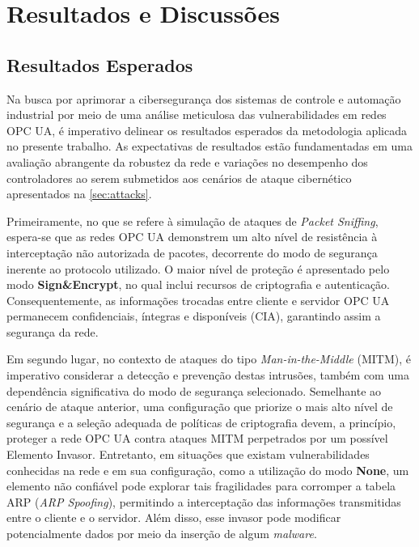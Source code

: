 \chapter{Resultados e Discussões} \label{cap:resultados}

\section{Resultados Esperados}

Na busca por aprimorar a cibersegurança dos sistemas de controle e automação industrial por meio de uma análise meticulosa das vulnerabilidades em redes OPC UA, é imperativo delinear os resultados esperados da metodologia aplicada no presente trabalho. As expectativas de resultados estão fundamentadas em uma avaliação abrangente da robustez da rede e variações no desempenho dos controladores ao serem submetidos aos cenários de ataque cibernético apresentados na \autoref{sec:attacks}.

Primeiramente, no que se refere à simulação de ataques de \textit{Packet Sniffing}, espera-se que as redes OPC UA demonstrem um alto nível de resistência à interceptação não autorizada de pacotes, decorrente do modo de segurança inerente ao protocolo utilizado. O maior nível de proteção é apresentado pelo modo \textbf{Sign\&Encrypt}, no qual inclui recursos de criptografia e autenticação. Consequentemente, as informações trocadas entre cliente e servidor OPC UA permanecem confidenciais, íntegras e disponíveis (CIA), garantindo assim a segurança da rede.

Em segundo lugar, no contexto de ataques do tipo \textit{Man-in-the-Middle} (MITM), é imperativo considerar a detecção e prevenção destas intrusões, também com uma dependência significativa do modo de segurança selecionado. Semelhante ao cenário de ataque anterior, uma configuração que priorize o mais alto nível de segurança e a seleção adequada de políticas de criptografia devem, a princípio, proteger a rede OPC UA contra ataques MITM perpetrados por um possível Elemento Invasor. Entretanto, em situações que existam vulnerabilidades conhecidas na rede e em sua configuração, como a utilização do modo \textbf{None}, um elemento não confiável pode explorar tais fragilidades para corromper a tabela ARP (\textit{ARP Spoofing}), permitindo a interceptação das informações transmitidas entre o cliente e o servidor. Além disso, esse invasor pode modificar potencialmente dados por meio da inserção de algum \textit{malware}.

